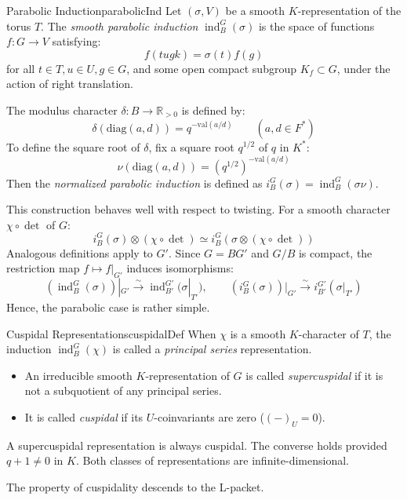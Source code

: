 \documentclass{article}
\begin{document}
\begin{defn}{Parabolic Induction}{parabolicInd}
  Let \((\sigma, V)\) be a smooth \(K\)-representation of the torus \(T\). The \emph{smooth parabolic induction} \(\operatorname{ind}_B^G(\sigma)\) is the space of functions \(f: G \to V\) satisfying:
  \[
    f(tugk) = \sigma(t)f(g)
  \]
  for all \(t \in T, u \in U, g \in G\), and some open compact subgroup \(K_f \subset G\), under the action of right translation.


  The modulus character \(\delta: B \to \mathbb{R}_{>0}\) is defined by:
  \[
    \delta(\mathrm{diag}(a, d)) = q^{-\mathrm{val}(a/d)} \qquad (a, d \in F^*)
  \]
  To define the square root of \(\delta\), fix a square root \(q^{1/2}\) of \(q\) in \(K^*\):
  \[
    \nu(\mathrm{diag}(a, d)) = (q^{1/2})^{-\mathrm{val}(a/d)}
  \]
  Then the \emph{normalized parabolic induction} is defined as \(i_B^G(\sigma) = \operatorname{ind}_B^G(\sigma \nu)\).
\end{defn}

This construction behaves well with respect to twisting. For a smooth character \(\chi \circ \det\) of \(G\):
\[ i_B^G(\sigma) \otimes (\chi \circ \det) \simeq i_B^G(\sigma \otimes (\chi \circ \det)) \]
Analogous definitions apply to \(G'\). Since \(G = BG'\) and \(G/B\) is compact, the restriction map \(f \mapsto f|_{G'}\) induces isomorphisms:
\[
  (\operatorname{ind}_B^G(\sigma))|_{G'} \xrightarrow{\sim} \operatorname{ind}_{B'}^{G'}(\sigma|_{T'}), \qquad (i_B^G(\sigma))|_{G'} \xrightarrow{\sim} i_{B'}^{G'}(\sigma|_{T'})
\]
Hence, the parabolic case is rather simple.
\begin{defn}{Cuspidal Representations}{cuspidalDef}
  When \(\chi\) is a smooth \(K\)-character of \(T\), the induction \(\operatorname{ind}_B^G(\chi)\) is called a \emph{principal series} representation.
  \begin{itemize}
      \item An irreducible smooth \(K\)-representation of \(G\) is called \emph{supercuspidal} if it is not a subquotient of any principal series.
      \item It is called \emph{cuspidal} if its \(U\)-coinvariants are zero (\((-)_U = 0\)).
  \end{itemize}
  A supercuspidal representation is always cuspidal. The converse holds provided \(q+1 \neq 0\) in \(K\). Both classes of representations are infinite-dimensional.
\end{defn}

The property of cuspidality descends to the L-packet.
\end{document}
